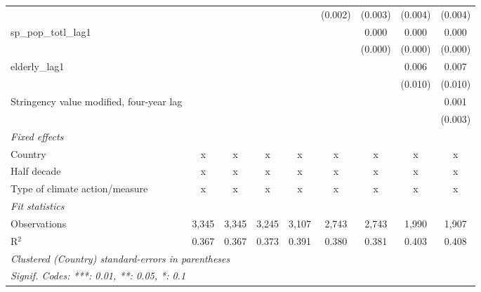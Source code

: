 \begin{tabular}{lcccccccc}
                                                   &              &              &                &                & (0.002)        & (0.003)        & (0.004)        & (0.004)\\   
   sp\_pop\_totl\_lag1                             &              &              &                &                &                & 0.000          & 0.000          & 0.000\\   
                                                   &              &              &                &                &                & (0.000)        & (0.000)        & (0.000)\\   
   elderly\_lag1                                   &              &              &                &                &                &                & 0.006          & 0.007\\   
                                                   &              &              &                &                &                &                & (0.010)        & (0.010)\\   
   Stringency value modified, four-year lag        &              &              &                &                &                &                &                & 0.001\\   
                                                   &              &              &                &                &                &                &                & (0.003)\\   
   \emph{Fixed effects}\\
   Country                                         & x            & x            & x              & x              & x              & x              & x              & x\\  
   Half decade                                     & x            & x            & x              & x              & x              & x              & x              & x\\  
   Type of climate action/measure                  & x            & x            & x              & x              & x              & x              & x              & x\\  
   \midrule \emph{Fit statistics}\\
   Observations                                    & 3,345        & 3,345        & 3,245          & 3,107          & 2,743          & 2,743          & 1,990          & 1,907\\  
   R$^2$                                           & 0.367        & 0.367        & 0.373          & 0.391          & 0.380          & 0.381          & 0.403          & 0.408\\  
   \midrule
   \multicolumn{9}{l}{\emph{Clustered (Country) standard-errors in parentheses}}\\
   \multicolumn{9}{l}{\emph{Signif. Codes: ***: 0.01, **: 0.05, *: 0.1}}\\
\end{tabular}
\par\endgroup


